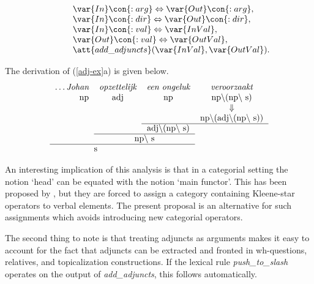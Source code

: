 \begin{equation}
\begin{array}[t]{l}
\hspace{1cm} \var{In}\con{:arg} \Leftrightarrow \var{Out}\con{:arg}, \\
\hspace{1cm} \var{In}\con{:dir} \Leftrightarrow \var{Out}\con{:dir}, \\
\hspace{1cm} \var{In}\con{:val} \Leftrightarrow \var{InVal}, \\
\hspace{1cm} \var{Out}\con{:val} \Leftrightarrow \var{OutVal}, \\
\hspace{1cm} \att{add\_adjuncts}(\var{InVal}, \var{OutVal}). \\
\end{array}
\end{equation} 

\noindent The derivation of (\ref{adj-ex}a) is given below.
{\sc 
\begin{equation}
\mbox{
\begin{tabular}[t]{rcccccc}
\ldots {\em Johan} & {\em opzettelijk} & {\em een ongeluk} & {\em veroorzaakt}\\
        np         &  adj              &  np  &  np$\backslash$(np$\backslash$ 
s) \\
                                                &&&$\Downarrow$ \\
                          &&& np$\backslash$(adj$\backslash$(np$\backslash$ s)) 
\\
\cline{3-4}     && \multicolumn{1}{c}{adj$\backslash$(np$\backslash$ s)} \\
\cline{2-3} & \multicolumn{2}{c}{np$\backslash$ s} \\
\cline{1-3}  \multicolumn{2}{c}{s} \\
\end{tabular}
}
\end{equation}
}

An interesting implication of this analysis is that in a categorial setting the
notion `head' can be equated with the notion `main functor'.  This has been
proposed by , but they are forced to assign a
category containing Kleene-star operators to verbal elements. The present
proposal is an alternative for such assignments which avoids introducing new
categorial operators.  

The second thing to note is that treating adjuncts as arguments makes it easy to 
account for the fact that adjuncts can be extracted and fronted in {\sc 
wh}-questions, relatives, and topicalization constructions. If the lexical rule 
{\em push\_to\_slash} operates on the output of {\em add\_adjuncts}, this 
follows automatically. 

